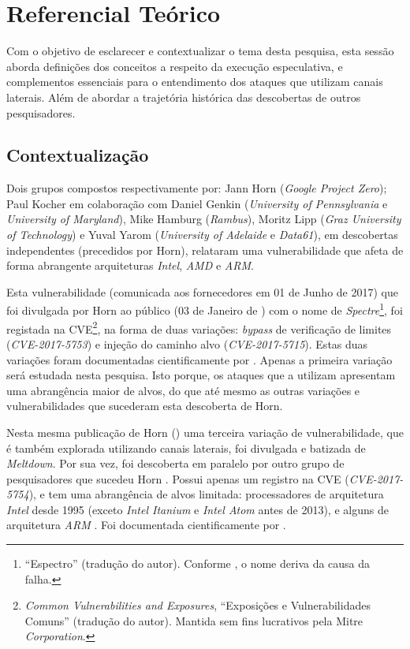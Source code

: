 \documentclass[
	article,			    %
	12pt,				    %
	oneside,			    %
	a4paper,			    %
	chapter=TITLE,		    %
	section=TITLE,		    %
	subsection=TITLE,	    %
	english,			    %
	brazil,				    %
	sumario=tradicional
]{abntex2}
\begin{document}
\section{Referencial Teórico}
Com o objetivo de esclarecer e contextualizar o tema desta pesquisa, esta sessão aborda definições dos conceitos a respeito da execução especulativa, e complementos essenciais para o entendimento dos ataques que utilizam canais laterais. Além de abordar a trajetória histórica das descobertas de outros pesquisadores.

\subsection{Contextualização}
Dois grupos compostos respectivamente por: Jann Horn (\emph{Google Project Zero}); Paul Kocher em colaboração com Daniel Genkin (\emph{University of Pennsylvania} e \emph{University of Maryland}), Mike Hamburg (\emph{Rambus}), Moritz Lipp (\emph{Graz University of Technology}) e Yuval Yarom (\emph{University of Adelaide} e \emph{Data61}), em descobertas independentes (precedidos por Horn), relataram uma vulnerabilidade que afeta de forma abrangente arquiteturas \emph{Intel}, \emph{AMD} e \emph{ARM}.

Esta vulnerabilidade (comunicada aos fornecedores em 01 de Junho de 2017) que foi divulgada por Horn ao público (03 de Janeiro de \citeyear{Jann2018Reading}) com o nome de \emph{Spectre}\footnote{``Espectro'' (tradução do autor). Conforme , o nome deriva da causa da falha.}, foi registada na CVE\footnote{\emph{Common Vulnerabilities and Exposures}, ``Exposições e Vulnerabilidades Comuns'' (tradução do autor). Mantida sem fins lucrativos pela Mitre \emph{Corporation}.}, na forma de duas variações: \emph{bypass} de verificação de limites (\emph{CVE-2017-5753}) e injeção do caminho alvo (\emph{CVE-2017-5715}). Estas duas variações foram documentadas cientificamente por . Apenas a primeira variação será estudada nesta pesquisa. Isto porque, os ataques que a utilizam apresentam uma abrangência maior de alvos, do que até mesmo as outras variações e vulnerabilidades que sucederam esta descoberta de Horn.

Nesta mesma publicação de Horn (\citeyear{Jann2018Reading}) uma terceira variação de vulnerabilidade, que é também explorada utilizando canais laterais, foi divulgada e batizada de \emph{Meltdown}. Por sua vez, foi descoberta em paralelo por outro grupo de pesquisadores que sucedeu Horn \cite{Graz2018Meltdown}. Possui apenas um registro na CVE (\emph{CVE-2017-5754}), e tem uma abrangência de alvos limitada: processadores de arquitetura \emph{Intel} desde 1995 (exceto \emph{Intel Itanium} e \emph{Intel Atom} antes de 2013), e alguns de arquitetura \emph{ARM} \cite{Graz2018Meltdown}. Foi documentada cientificamente por .
\end{document}
